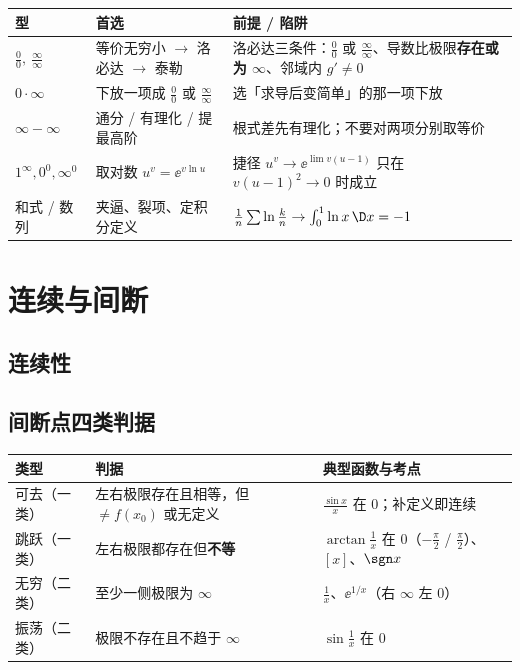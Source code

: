 \documentclass[UTF8,11pt]{ctexart}
\begin{document}
\begin{center}
\renewcommand{\arraystretch}{1.2}
\begin{tabular}{@{}p{3.0cm}p{5.0cm}p{7.0cm}@{}}
\toprule
\textbf{型} & \textbf{首选} & \textbf{前提 / 陷阱} \\
\midrule
$\frac00,\ \frac{\infty}{\infty}$ & 等价无穷小 $\to$ 洛必达 $\to$ 泰勒 & 洛必达三条件：$\frac00$ 或 $\frac{\infty}{\infty}$、导数比极限\textbf{存在或为 $\infty$}、邻域内 $g'\ne0$ \\
$0\cdot\infty$ & 下放一项成 $\frac00$ 或 $\frac{\infty}{\infty}$ & 选「求导后变简单」的那一项下放 \\
$\infty-\infty$ & 通分 / 有理化 / 提最高阶 & 根式差先有理化；不要对两项分别取等价 \\
$1^\infty,0^0,\infty^0$ & 取对数 $u^v=\ee^{v\ln u}$ & 捷径 $u^v\to\ee^{\lim v(u-1)}$ 只在 $v(u-1)^2\to0$ 时成立 \\
和式 / 数列 & 夹逼、裂项、定积分定义 & $\frac1n\sum\ln\frac{k}{n}\to\int_0^1\ln x\,\D x=-1$ \\
\bottomrule
\end{tabular}
\end{center}


\section{连续与间断}
\subsection{连续性}


\subsection{间断点四类判据}

\begin{center}
\renewcommand{\arraystretch}{1.2}
\begin{tabular}{@{}p{2.4cm}p{5.3cm}p{7.3cm}@{}}
\toprule
\textbf{类型} & \textbf{判据} & \textbf{典型函数与考点} \\
\midrule
可去（一类） & 左右极限存在且相等，但 $\ne f(x_0)$ 或无定义 & $\frac{\sin x}{x}$ 在 $0$；补定义即连续 \\
跳跃（一类） & 左右极限都存在但\textbf{不等} & $\arctan\frac1x$ 在 $0$（$-\frac\pi2$ / $\frac\pi2$）、$[x]$、$\sgn x$ \\
无穷（二类） & 至少一侧极限为 $\infty$ & $\frac1x$、$\ee^{1/x}$（右 $\infty$ 左 $0$）\\
振荡（二类） & 极限不存在且不趋于 $\infty$ & $\sin\frac1x$ 在 $0$ \\
\bottomrule
\end{tabular}
\end{center}
\end{document}
